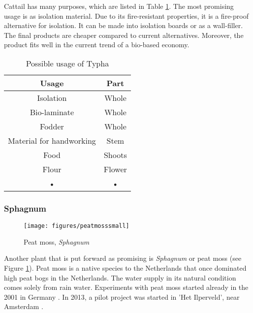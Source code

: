 \documentclass[12pt,a4paper,titlepage]{article}
\begin{document}
Cattail has many purposes, which are listed in Table \ref{tab:typha}. The most promising usage is as isolation material. Due to its fire-resistant properties, it is a fire-proof alternative for isolation. It can be made into isolation boards or as a wall-filler. The final products are cheaper compared to current alternatives. Moreover, the product fits well in the current trend of a bio-based economy.


\begin{table}
\centering
\caption{Possible usage of Typha}
\begin{tabular}{|c|c|}
\hline 
\textbf{Usage} & \textbf{Part} \\ 
\hline 
Isolation & Whole \\ 
\hline 
Bio-laminate & Whole \\ 
\hline 
Fodder & Whole \\ 
\hline 
Material for handworking & Stem \\ 
\hline 
Food & Shoots \\ 
\hline 
Flour & Flower \\ 
\hline 
• & • \\ 
\hline 
\end{tabular} 
\label{tab:typha}
\end{table}

\subsubsection{Sphagnum}

\begin{figure}
    \centering
    \texttt{[image: figures/peatmosssmall]} 
    \caption{Peat moss, \textit{Sphagnum}}
    \label{fig:peatmoss}
\end{figure}

Another plant that is put forward as promising is \textit{Sphagnum} or peat moss (see Figure \ref{fig:peatmoss}). Peat moss is a native species to the Netherlands that once dominated high peat bogs in the Netherlands. The water supply in its natural condition comes solely from rain water. Experiments with peat moss started already in the 2001 in Germany \citep{gaudig2014sphagnum}. In 2013, a pilot project was started in 'Het Ilperveld', near Amsterdam \citep{van2013werk}. 

\end{document}
